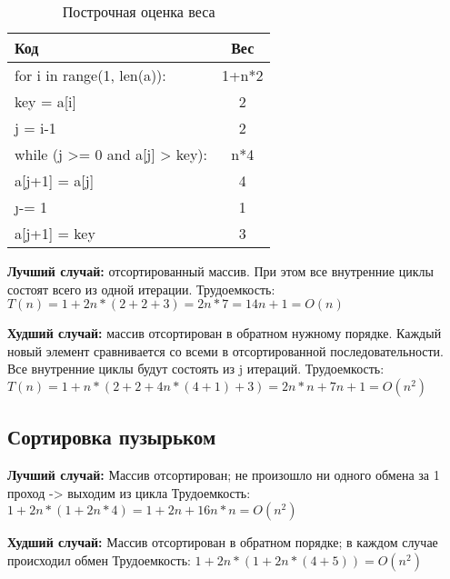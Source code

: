 \begin{table}[h]
	\begin{center}
		\caption{Построчная оценка веса}
		\label{tabular:insert_compl}
		\begin{tabular}{|l c|} 
			\hline
			Код & Вес \\ [0.5ex] 
			\hline
			for i in range(1, len(a)): & 1+n*2\\
			\hline
			key = a[i] & 2\\
			\hline
			j = i-1 & 2\\
			\hline
			while (j >= 0 and a[j] > key): & n*4\\
			\hline
			a[j+1] = a[j] & 4\\
			\hline
			\j -= 1 & 1\\
			\hline
			a[j+1] = key & 3\\
			\hline
		\end{tabular}
	\end{center}
\end{table}


\textbf{Лучший случай:} отсортированный массив. При этом все внутренние циклы состоят всего из одной итерации.\newline
Трудоемкость: $T(n) = 1 + 2n * (2+2+3)  =  2n * 7 = 14n + 1 = O(n)$

\textbf{Худший случай:} массив отсортирован в обратном нужному порядке. Каждый новый элемент сравнивается со всеми в отсортированной последовательности.
Все внутренние циклы будут состоять из j итераций. \newline
Трудоемкость: $T(n) = 1+n*(2+2+4n*(4+1)+3) = 2n*n+7n+1 =  O(n^{2})$

\subsection{Сортировка пузырьком}
\textbf{Лучший случай:} Массив отсортирован; не произошло ни одного обмена за 1 проход -> выходим из цикла \newline
Трудоемкость:  $1+2n*(1 + 2n*4) = 1+2n+16n*n=  O(n^{2})$

\textbf{Худший случай:}  Массив отсортирован в обратном порядке; в каждом случае происходил обмен\newline
Трудоемкость: $1+2n*(1 + 2n*(4+5)) = O(n^2)$


